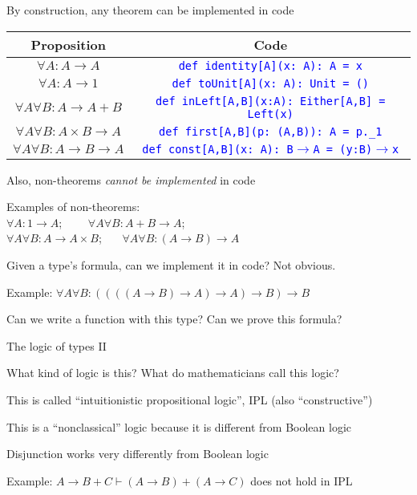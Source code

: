 By construction, any theorem can be implemented in code
\begin{center}
\begin{tabular}{|c|c|}
\hline 
\textbf{Proposition} & \textbf{Code}\tabularnewline
\hline 
\hline 
$\forall A:A\rightarrow A$ & \texttt{\textcolor{blue}{\footnotesize{}def identity{[}A{]}(x:\ A):\ A
= x}}\tabularnewline
\hline 
$\forall A:A\rightarrow1$ & \texttt{\textcolor{blue}{\footnotesize{}def toUnit{[}A{]}(x:\ A): Unit
= ()}}\tabularnewline
\hline 
$\forall A\forall B:A\rightarrow A+B$ & \texttt{\textcolor{blue}{\footnotesize{}def inLeft{[}A,B{]}(x:A):\ Either{[}A,B{]}
= Left(x)}}\tabularnewline
\hline 
$\forall A\forall B:A\times B\rightarrow A$ & \texttt{\textcolor{blue}{\footnotesize{}def first{[}A,B{]}(p:\ (A,B)):\ A
= p.\_1}}\tabularnewline
\hline 
$\forall A\forall B:A\rightarrow B\rightarrow A$ & \texttt{\textcolor{blue}{\footnotesize{}def const{[}A,B{]}(x:\ A):\ B$\rightarrow$A
= (y:B)$\rightarrow$x}}\tabularnewline
\hline 
\end{tabular}
\par\end{center}

Also, non-theorems \emph{cannot be implemented} in code 

Examples of non-theorems:\\
 $\forall A:1\rightarrow A$; \  \  $\quad\forall A\forall B:A+B\rightarrow A$;
\\
$\forall A\forall B:A\rightarrow A\times B$; \  $\quad\forall A\forall B:(A\rightarrow B)\rightarrow A$

Given a type's formula, can we implement it in code? Not obvious.

Example: $\forall A\forall B:((((A\rightarrow B)\rightarrow A)\rightarrow A)\rightarrow B)\rightarrow B$

Can we write a function with this type? Can we prove this formula?

The logic of types II

What kind of logic is this? What do mathematicians call this logic?

This is called \textsf{``}intuitionistic propositional logic\textsf{''}, IPL (also
\textsf{``}constructive\textsf{''})

This is a \textsf{``}nonclassical\textsf{''} logic because it is different from Boolean
logic

Disjunction works very differently from Boolean logic

Example: $A\rightarrow B+C\vdash(A\rightarrow B)+(A\rightarrow C)$
does not hold in IPL

